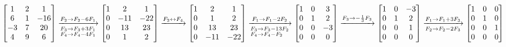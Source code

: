 \begin{enumerate}[label=\color{red}\textbf{\arabic*)}]
\begin{enumerate}[label=\arabic*)]
            $\begin{bmatrix} 
                1 & 2 & 1 \\
                6 & 1 & -16\\
                -3 & 7 & 20\\
                4 & 9 & 6
            \end{bmatrix}\xrightarrow[\begin{subarray}{l}
                F_3\to F_3+3F_1\\
                F_4\to F_4-4F_1
            \end{subarray}]{F_2\to F_2-6F_1}\begin{bmatrix} 
                1 & 2 & 1\\
                0 & -11 & -22\\
                0 & 13 & 23\\
                0 & 1 & 2
            \end{bmatrix}\xrightarrow{F_2\leftrightarrow F_4}\begin{bmatrix} 
                1 & 2 & 1\\
                0 & 1 & 2\\
                0 & 13 & 23\\
                0 & -11 & -22
            \end{bmatrix}\xrightarrow[\begin{subarray}{l}
                F_3\to F_3-13F_2\\
                F_4\to F_4-F_2
            \end{subarray}]{F_1\to F_1-2F_2}\begin{bmatrix} 
                1 & 0 & 3\\
                0 & 1 & 2\\
                0 & 0 & -3\\
                0 & 0 & 0
            \end{bmatrix}\xrightarrow{F_3\to -\frac{1}{3} F_3}\begin{bmatrix} 
                1 & 0 & -3\\
                0 & 1 & 2\\
                0 & 0 & 1\\
                0 & 0 & 0
            \end{bmatrix}\xrightarrow[F_2\to F_2-2F_3]{F_1\to F_1+3F_3}\begin{bmatrix} 
                1 & 0 & 0\\
                0 & 1 & 0\\
                0 & 0 & 1\\
                0 & 0 & 0
            \end{bmatrix}$


\end{enumerate}
\end{enumerate}
